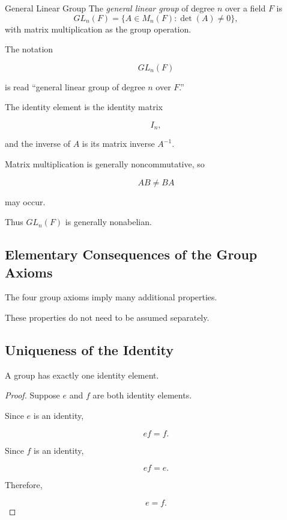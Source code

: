 \begin{definitionbox}{General Linear Group}
The \emph{general linear group} of degree \(n\) over a field \(F\) is
\[ GL_n(F)=\{A\in M_n(F):\det(A)\neq0\}, \]
with matrix multiplication as the group operation.
\end{definitionbox}

The notation

\[ GL_n(F) \]

is read ``general linear group of degree \(n\) over \(F\).''

The identity element is the identity matrix

\[ I_n, \]

and the inverse of \(A\) is its matrix inverse \(A^{-1}\).

Matrix multiplication is generally noncommutative, so

\[ AB\neq BA \]

may occur.

Thus \(GL_n(F)\) is generally nonabelian.

\subsection{Elementary Consequences of the Group Axioms}
\label{subsec:group-axiom-consequences}

The four group axioms imply many additional properties.

These properties do not need to be assumed separately.

\subsection{Uniqueness of the Identity}
\label{subsec:group-identity-unique}

\begin{theorem}
A group has exactly one identity element.
\end{theorem}

\begin{proof}
Suppose \(e\) and \(f\) are both identity elements.

Since \(e\) is an identity,

\[ ef=f. \]

Since \(f\) is an identity,

\[ ef=e. \]

Therefore,

\[ e=f. \]
\end{proof}

